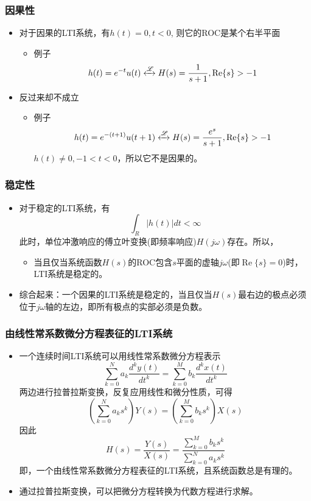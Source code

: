 \documentclass[CJKutf8,dvipsnames,table]{beamer}
\begin{document}
\begin{CJK*}{UTF8}{song}
  \begin{frame}
    \frametitle{因果性}
    \begin{itemize}
    \item 对于因果的LTI系统，有$h(t)=0, t < 0$,
	则它的ROC是某个右半平面
		\begin{itemize}
		\item 例子
		\[
			h(t) = e^{-t}u(t) \xleftrightarrow{\mathscr{L}} H(s) = \frac{1}{s+1}, \operatorname{Re}\{s\} > -1
		\]
		\end{itemize}
	\item 反过来却不成立
		\begin{itemize}
		\item 例子
		\[
			h(t) = e^{-(t+1)}u(t+1) \xleftrightarrow{\mathscr{L}} H(s) = \frac{e^s}{s+1}, \operatorname{Re}\{s\} > -1
		\]
		$h(t) \neq 0, -1 < t < 0$，所以它不是因果的。
		\end{itemize}
	
    \end{itemize}
  \end{frame}   
    
  \begin{frame}
    \frametitle{稳定性}
    \begin{itemize}
    \item 对于稳定的LTI系统，有
    \[
    	\int_R |h(t)|dt < \infty
    \]
    此时，单位冲激响应的傅立叶变换(即频率响应)$H(j\omega)$存在。所以，
    	\begin{itemize}
    	\item 当且仅当系统函数$H(s)$的ROC包含$s$平面的虚轴$j\omega$(即$\operatorname{Re}\{s\}=0$)时，LTI系统是稳定的。
    	\end{itemize}
	\item 综合起来：一个因果的LTI系统是稳定的，当且仅当$H(s)$最右边的极点必须位于$j\omega$轴的左边，即所有极点的实部必须是负数。
	
    \end{itemize}
  \end{frame}   
      
  \begin{frame}
    \frametitle{由线性常系数微分方程表征的LTI系统}
    \begin{itemize}
    \item 一个连续时间LTI系统可以用线性常系数微分方程表示
    \[
    	\sum_{k=0}^{N} a_k \frac{d^k y(t)}{dt^k} = \sum_{k=0}^{M} b_k \frac{d^k x(t)}{dt^k}
    \]
    两边进行拉普拉斯变换，反复应用线性和微分性质，可得
    \[
    	(\sum_{k=0}^{N} a_k s^k)Y(s)  = (\sum_{k=0}^{M} b_k s^k ) X(s)
    \]
    因此
    \[
    	H(s) = \frac{Y(s)}{X(s)} = \frac{\sum_{k=0}^{M} b_k s^k}{\sum_{k=0}^{N} a_k s^k}    
    \]
    即，一个由线性常系数微分方程表征的LTI系统，且系统函数总是有理的。
    \item 通过拉普拉斯变换，可以把微分方程转换为代数方程进行求解。
    \end{itemize}
  \end{frame}    
  

\end{CJK*}
\end{document}
